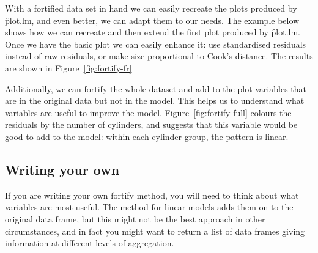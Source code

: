 With a fortified data set in hand we can easily recreate the plots produced by \f{plot.lm}, and even better, we can adapt them to our needs.  The example below shows how we can recreate and then extend the first plot produced by \f{plot.lm}.  Once we have the basic plot we can easily enhance it: use standardised residuals instead of raw residuals, or make size proportional to Cook's distance.  The results are shown in Figure~\ref{fig:fortify-fr}

% 


Additionally, we can fortify the whole dataset and add to the plot variables that are in the original data but not in the model.  This helps us to understand what variables are useful to improve the model.  Figure~\ref{fig:fortify-full} colours the residuals by the number of cylinders, and suggests that this variable would be good to add to the model: within each cylinder group, the pattern is linear.

% 


\subsection{Writing your own}

If you are writing your own fortify method, you will need to think about what variables are most useful.  The method for linear models adds them on to the original data frame, but this might not be the best approach in other circumstances, and in fact you might want to return a list of data frames giving information at different levels of aggregation.

